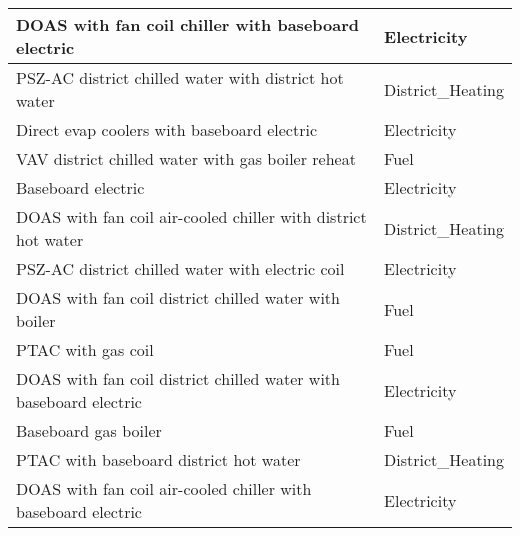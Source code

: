 \begin{table}[hb!]
\begin{tabular}{|l|l|}
DOAS with fan coil chiller with baseboard electric          & Electricity                    \\ \hline
PSZ-AC district chilled water with district hot water       & District\_Heating              \\ \hline
Direct evap coolers with baseboard electric                 & Electricity                    \\ \hline
VAV district chilled water with gas boiler reheat           & Fuel                           \\ \hline
Baseboard electric                                          & Electricity                    \\ \hline
DOAS with fan coil air-cooled chiller with district hot water     & District\_Heating        \\ \hline
PSZ-AC district chilled water with electric coil            & Electricity                    \\ \hline
DOAS with fan coil district chilled water with boiler       & Fuel                           \\ \hline
PTAC with gas coil                                          & Fuel                           \\ \hline
DOAS with fan coil district chilled water with baseboard electric & Electricity              \\ \hline
Baseboard gas boiler                                        & Fuel                           \\ \hline
PTAC with baseboard district hot water                      & District\_Heating              \\ \hline
DOAS with fan coil air-cooled chiller with baseboard electric     & Electricity       \\ \hline
\end{tabular}
\end{table}